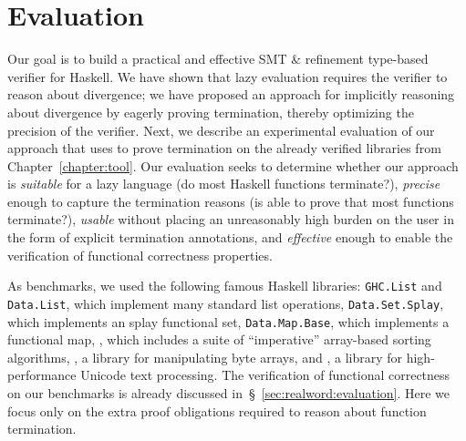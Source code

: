 \section{Evaluation}\label{sec:refinedhaskell:evaluation}

Our goal is to build a practical and effective 
SMT \& refinement type-based verifier for Haskell. 
%
We have shown that lazy evaluation requires the 
verifier to reason about divergence; we have proposed 
an approach for implicitly reasoning about divergence 
by eagerly proving termination, thereby optimizing 
the precision of the verifier.
%
Next, we describe an experimental evaluation of our 
approach that uses \toolname to prove termination 
on the already verified libraries from Chapter~\ref{chapter:tool}.
%
Our evaluation seeks to determine whether our approach is
%
\emph{suitable} for a lazy language (\ie do most Haskell functions terminate?),
\emph{precise}  enough to  capture the termination reasons (\ie is \toolname able to prove that most functions terminate?), 
\emph{usable}   without placing an unreasonably high burden on the user in the form of explicit termination annotations, and
\emph{effective}  enough to  enable the verification of functional correctness properties.
%


As benchmarks, we used the following famous Haskell libraries:
%
\texttt{GHC.List} and \texttt{Data.List}, which implement many standard
list operations,
\texttt{Data.Set.Splay}, which implements an splay functional set,
\texttt{Data.Map.Base}, which implements a functional 
map,
\libvectoralgos, 
which includes a suite of ``imperative'' %
array-based sorting algorithms,
\bytestring, a library for manipulating byte arrays, and
\libtext, a library for high-performance Unicode text processing. 
%
The verification of functional correctness on our benchmarks
is already discussed in~\S~\ref{sec:realword:evaluation}. 
%
Here we focus only on the extra proof obligations 
required to reason about function termination. 

